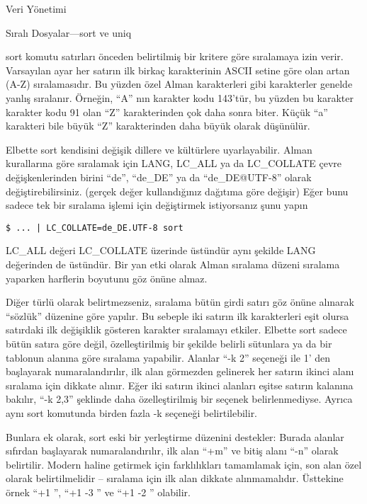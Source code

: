 \begin{section}{Veri Yönetimi}
\begin{subsection}{Sıralı Dosyalar—sort ve uniq}

sort komutu satırları önceden belirtilmiş bir kritere göre sıralamaya izin verir. Varsayılan ayar her satırın ilk birkaç karakterinin ASCII setine göre olan artan (A-Z) sıralamasıdır. Bu yüzden özel Alman karakterleri gibi karakterler genelde yanlış sıralanır. Örneğin, “A” nın karakter kodu 143'tür, bu yüzden bu karakter karakter kodu 91 olan “Z” karakterinden çok daha sonra biter. Küçük “a” karakteri bile büyük “Z” karakterinden daha büyük olarak düşünülür.

Elbette sort kendisini değişik dillere ve kültürlere uyarlayabilir. Alman kurallarına göre sıralamak için LANG, LC\_ALL ya da LC\_COLLATE  çevre değişkenlerinden birini “de”, “de\_DE” ya da “de\_DE@UTF-8” olarak değiştirebilirsiniz. (gerçek değer kullandığınız dağıtıma göre değişir) Eğer bunu sadece tek bir sıralama işlemi için değiştirmek istiyorsanız şunu yapın
\begin{verbatim}
$ ... | LC_COLLATE=de_DE.UTF-8 sort
\end{verbatim}

LC\_ALL değeri LC\_COLLATE üzerinde üstündür aynı şekilde LANG değerinden de üstündür. Bir yan etki olarak Alman sıralama düzeni sıralama yaparken harflerin boyutunu göz önüne almaz.


Diğer türlü olarak belirtmezseniz, sıralama bütün girdi satırı göz önüne alınarak “sözlük” düzenine göre yapılır. Bu sebeple iki satırın ilk karakterleri eşit olursa satırdaki ilk değişiklik gösteren karakter sıralamayı etkiler. Elbette sort sadece bütün satıra göre değil, özelleştirilmiş bir şekilde belirli sütunlara ya da bir tablonun alanına göre sıralama yapabilir. Alanlar “-k 2” seçeneği ile 1' den başlayarak numaralandırılır, ilk alan görmezden gelinerek her satırın ikinci alanı sıralama için dikkate alınır. Eğer iki satırın ikinci alanları eşitse satırın kalanına bakılır, “-k 2,3” şeklinde daha özelleştirilmiş bir seçenek belirlenmediyse. Ayrıca aynı sort komutunda birden fazla -k seçeneği belirtilebilir. 

Bunlara ek olarak, sort eski bir yerleştirme düzenini destekler: Burada alanlar sıfırdan başlayarak numaralandırılır, ilk alan “+m” ve bitiş alanı “-n” olarak belirtilir. Modern haline getirmek için farklılıkları tamamlamak için, son alan özel olarak belirtilmelidir – sıralama için ilk alan dikkate alınmamalıdır. Üsttekine örnek “+1 ”, “+1 -3 ” ve “+1 -2 ” olabilir. 


\end{subsection}
\end{section}
